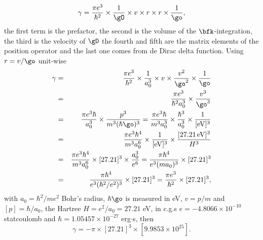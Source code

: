 \documentclass[12pt,leqno]{article}
\numberwithin{equation}{section}
\begin{document}
\begin{itemize}
\begin{itemize}
\begin{equation*}\label{unp}
\gamma=\frac{\pi e^3}{\hbar^2}\times\frac{1}{\gO}\times v \times 
r\times r \times \frac{1}{\go}
,
\end{equation*} 
the first term is the prefactor, the second is the volume of the
$\bfk$-integration, the third is the velocity of $\gD$ the fourth and
fifth are the matrix elements of the position operator and the last
one comes from de Dirac delta function. Using $r=v/\go$ unit-wise
\begin{eqnarray*}\label{un1}
\gamma
&=&
\frac{\pi e^3}{\hbar^2}\times\frac{1}{a_0^3}\times v \times
\frac{v^2}{\go^2}
\times \frac{1}{\go}
\nonumber\\
&=&
\frac{\pi e^3}{\hbar^2a_0^3}\times
\frac{v^3}{\go^3}
\nonumber\\
&=&
\frac{\pi e^3\hbar}{a_0^3}\times
\frac{p^3}{m^3(\hbar\go)^3}
=
\frac{\pi e^3\hbar}{m^3a_0^3}\times
\frac{\hbar^3}{a_0^3}
\times
\frac{1}{[\mathrm{eV}]^3}
\nonumber\\
&=&
\frac{\pi e^3\hbar^4}{m^3a_0^6}\times
\frac{1}{[\mathrm{eV}]^3}
\times
\frac{[27.21\,\mathrm{eV}]^3}{H^3}
\nonumber\\
&=&
\frac{\pi e^3\hbar^4}{m^3a_0^6}\times
[27.21]^3
\times
\frac{a_0^3}{e^6}
=
\frac{\pi \hbar^4}{e^3(ma_0)^3}\times
[27.21]^3
\nonumber\\
&=&
\frac{\pi \hbar^4}{e^3(\hbar^2/e^2)^3}\times
[27.21]^3
=
\frac{\pi e^3}{\hbar^2}\times
[27.21]^3
,
\end{eqnarray*}
with $a_0=\hbar^2/me^2$ Bohr's radius, $\hbar\go$ is measured in eV, $v=p/m$ and
$[p]=\hbar/a_0$, the Hartree $H=e^2/a_0=27.21$ eV, in c.g.s
$e=-4.8066\times 10^{-10}$ statcoulomb and $\hbar=1.05457\times
10^{-27}$ erg$\cdot$s, then
\begin{equation*}\label{gam2}
\gamma=-
\pi
\times
[27.21]^3
\times
[9.9853\times 10^{25}]
.
\end{equation*}


\end{itemize}
\end{itemize}
\end{document}
